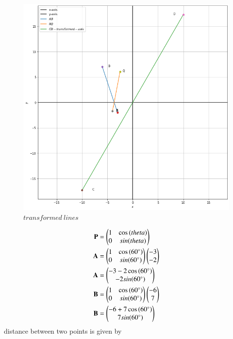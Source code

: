 \documentclass[journal,12pt,twocolumn]{IEEEtran}
\begin{document}
\begin{figure}[!h]
\includegraphics[width=\columnwidth]{Dis btw two points.png}
\caption{$transformed \ lines$}
\label{fig:straight lines}	
\end{figure}
\begin{align}
\mathbf{P} &=\begin{pmatrix}1 & \cos{(theta)}\\ 0 & sin{(theta)}\end{pmatrix}\\
\mathbf{A} &=\begin{pmatrix}1 & \cos{(\ang{60} )}\\ 0 & sin{(\ang{60} )}\end{pmatrix} \begin{pmatrix}-3 \\ -2\end{pmatrix}\\
\mathbf{A} &=\begin{pmatrix}-3 -2\cos{(\ang{60} )}\\  -2sin{(\ang{60} )}\end{pmatrix} \\
\mathbf{B} &=\begin{pmatrix}1 & \cos{(\ang{60} )}\\ 0 & sin{(\ang{60} )}\end{pmatrix} \begin{pmatrix}-6 \\ 7\end{pmatrix}\\
\mathbf{B} &=\begin{pmatrix}-6 +7\cos{(\ang{60} )}\\  7sin{(\ang{60} )}\end{pmatrix} 
\end{align}
distance between two points is given by
\end{document}
